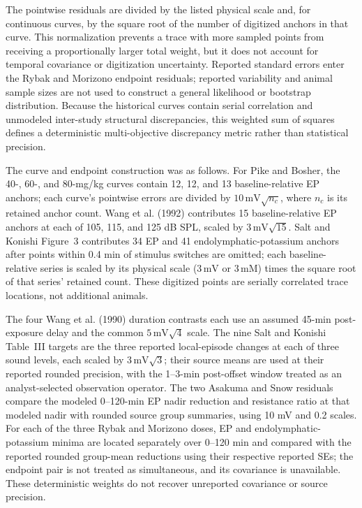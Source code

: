 \documentclass[final,5p,times]{elsarticle}
\begin{document}
The pointwise residuals are divided by the listed physical scale and, for continuous curves, by the square root of the number of digitized anchors in that curve. This normalization prevents a trace with more sampled points from receiving a proportionally larger total weight, but it does not account for temporal covariance or digitization uncertainty. Reported standard errors enter the Rybak and Morizono endpoint residuals; reported variability and animal sample sizes are not used to construct a general likelihood or bootstrap distribution. Because the historical curves contain serial correlation and unmodeled inter-study structural discrepancies, this weighted sum of squares defines a deterministic multi-objective discrepancy metric rather than statistical precision.

The curve and endpoint construction was as follows. For Pike and Bosher, the 40-, 60-, and 80-mg/kg curves contain 12, 12, and 13 baseline-relative EP anchors; each curve's pointwise errors are divided by \(10\,\mathrm{mV}\sqrt{n_c}\), where \(n_c\) is its retained anchor count. Wang et al. (1992) contributes 15 baseline-relative EP anchors at each of 105, 115, and 125 dB SPL, scaled by \(3\,\mathrm{mV}\sqrt{15}\). Salt and Konishi Figure~3 contributes 34 EP and 41 endolymphatic-potassium anchors after points within 0.4 min of stimulus switches are omitted; each baseline-relative series is scaled by its physical scale (\(3\,\mathrm{mV}\) or \(3\,\mathrm{mM}\)) times the square root of that series' retained count. These digitized points are serially correlated trace locations, not additional animals.

The four Wang et al. (1990) duration contrasts each use an assumed 45-min post-exposure delay and the common \(5\,\mathrm{mV}\sqrt{4}\) scale. The nine Salt and Konishi Table~III targets are the three reported local-episode changes at each of three sound levels, each scaled by \(3\,\mathrm{mV}\sqrt{3}\); their source means are used at their reported rounded precision, with the 1--3-min post-offset window treated as an analyst-selected observation operator. The two Asakuma and Snow residuals compare the modeled 0--120-min EP nadir reduction and resistance ratio at that modeled nadir with rounded source group summaries, using 10 mV and 0.2 scales. For each of the three Rybak and Morizono doses, EP and endolymphatic-potassium minima are located separately over 0--120 min and compared with the reported rounded group-mean reductions using their respective reported SEs; the endpoint pair is not treated as simultaneous, and its covariance is unavailable. These deterministic weights do not recover unreported covariance or source precision.
\end{document}
